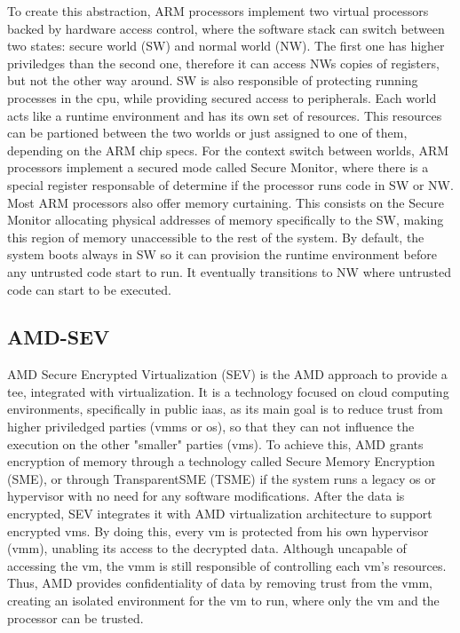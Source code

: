 To create this abstraction, ARM processors implement two virtual processors backed by hardware access control, where the software stack can switch between two states: secure world (SW) and normal world (NW). 
The first one has higher priviledges than the second one, therefore it can access NWs copies of registers, but not the other way around. SW is also responsible of protecting running processes in the \gls{cpu}, while providing secured access to peripherals. 
Each world acts like a runtime environment and has its own set of resources. This resources can be partioned between the two worlds or just assigned to one of them, depending on the ARM chip specs.
For the context switch between worlds, ARM processors implement a secured mode called Secure Monitor, where there is a special register responsable of determine if the processor runs code in SW or NW. 
Most ARM processors also offer memory curtaining. This consists on the Secure Monitor allocating physical addresses of memory specifically to the SW, making this region of memory unaccessible to the rest of the system.
By default, the system boots always in SW so it can provision the runtime environment before any untrusted code start to run. It eventually transitions to NW where untrusted code can start to be executed. 

\subsection{AMD-SEV}
\label{ssec:amdsev}
AMD Secure Encrypted Virtualization (SEV) \cite{amdPaper} is the AMD approach to provide a \gls{tee}, integrated with virtualization. It is a technology focused on cloud computing environments, specifically in public \gls{iaas}, as its main goal is to reduce trust from higher priviledged parties (\gls{vmm}s or \gls{os}), so that they can not influence the execution on the other "smaller" parties (\gls{vm}s). 
To achieve this, AMD grants encryption of memory through a technology called Secure Memory Encryption (SME), or through TransparentSME (TSME) if the system runs a legacy \gls{os} or hypervisor with no need for any software modifications.
After the data is encrypted, SEV integrates it with AMD virtualization architecture to support encrypted \gls{vm}s. By doing this, every \gls{vm} is protected from his own hypervisor (\gls{vmm}), unabling its access to the decrypted data. Although uncapable of accessing the \gls{vm}, the \gls{vmm} is still responsible of controlling each \gls{vm}'s resources. 
Thus, AMD provides confidentiality of data by removing trust from the \gls{vmm}, creating an isolated environment for the \gls{vm} to run, where only the \gls{vm} and the processor can be trusted. 

